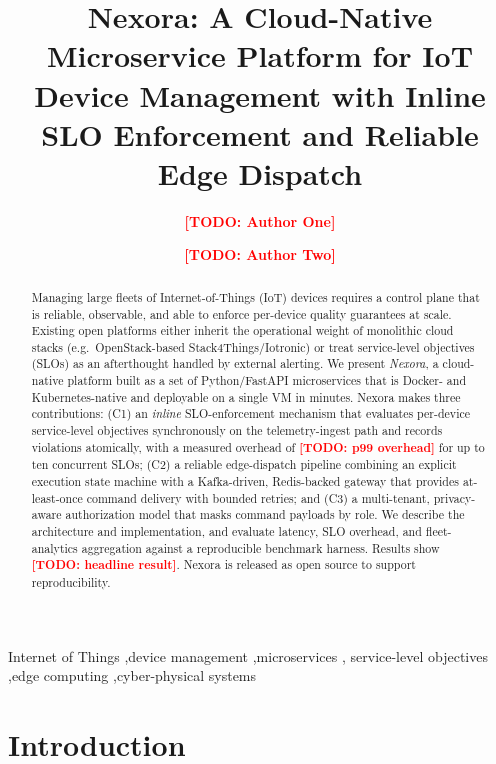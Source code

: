 \documentclass[review,12pt]{elsarticle}
\newcommand{\TODO}[1]{\textcolor{red}{\textbf{[TODO: #1]}}}
\begin{document}
\begin{frontmatter}

\title{Nexora: A Cloud-Native Microservice Platform for IoT Device
Management with Inline SLO Enforcement and Reliable Edge Dispatch}

\author[a]{\TODO{Author One}}
\author[a]{\TODO{Author Two}}
\address[a]{\TODO{Affiliation, Department, University, City, Country}}

\begin{abstract}
Managing large fleets of Internet-of-Things (IoT) devices requires a control
plane that is reliable, observable, and able to enforce per-device quality
guarantees at scale. Existing open platforms either inherit the operational
weight of monolithic cloud stacks (e.g.\ OpenStack-based Stack4Things/Iotronic)
or treat service-level objectives (SLOs) as an afterthought handled by external
alerting. We present \emph{Nexora}, a cloud-native platform built as a set of
Python/FastAPI microservices that is Docker- and Kubernetes-native and
deployable on a single VM in minutes. Nexora makes three contributions:
(C1) an \emph{inline} SLO-enforcement mechanism that evaluates per-device
service-level objectives synchronously on the telemetry-ingest path and records
violations atomically, with a measured overhead of \TODO{p99 overhead} for up
to ten concurrent SLOs; (C2) a reliable edge-dispatch pipeline combining an
explicit execution state machine with a Kafka-driven, Redis-backed gateway that
provides at-least-once command delivery with bounded retries; and (C3) a
multi-tenant, privacy-aware authorization model that masks command payloads by
role. We describe the architecture and implementation, and evaluate latency,
SLO overhead, and fleet-analytics aggregation against a reproducible benchmark
harness. Results show \TODO{headline result}. Nexora is released as open source
to support reproducibility.
\end{abstract}

\begin{keyword}
Internet of Things \sep device management \sep microservices \sep
service-level objectives \sep edge computing \sep cyber-physical systems
\end{keyword}

\end{frontmatter}

\linenumbers

\section{Introduction}
\label{sec:intro}
\end{document}
